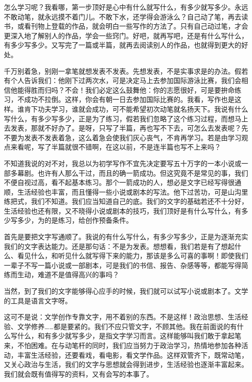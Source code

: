 \documentclass[fontset=fandol,12pt,a5paper]{ctexbook}
\begin{document}
怎么学习呢？我看哪，第一步顶好是心中有什么就写什么，有多少就写多少。永远不敢动笔，就永远摸不着门儿。不敢下水，还学得会游泳么？自己动了笔，再去读书，或看刊物上登载的作品，就会明白一些写作的方法了。只有自己动过笔，才会更深入地了解别人的作品，学会一些窍门。好吧，就再写吧，还是有什么写什么，有多少写多少。又写完了一篇或半篇，就再去阅读别人的作品，也就得到更大的好处。

千万别着急，别刚一拿笔就想发表不发表。先想发表，不是实事求是的办法。假若有个人告诉我们：他刚下过两次水，可是决定马上去参加国际游泳比赛，我们会相信他能得胜而归吗？不会！我们必定这么鼓舞他：你的志愿很好，可是要拚命练习，不成功不拉倒。这样，你会有朝一日去参加国际比赛的。我看，写作也是这样。谁肯下功夫学习，谁就会成功，可不能希望初次动笔就名扬天下。我说有什么写什么，有多少写多少，正是为了练习，假若我们忽略了这个练习过程，而想马上去发表，那就不好办了。是呀，只写了半篇，再也写不下去，可怎么去发表呢？先不要为发表不发表着急，这么着急会使我们灰心丧气，不肯再学习。若是由学习观点来看呢，写了半篇就很不错啊，在这以前，不是连半篇也写不上来吗？

不知道我说的对不对，我总以为初学写作不宜先决定要写五十万字的一本小说或一部多幕剧。也许有人那么干过，而且的确一箭成功。但这究竟不是常见的事，我们不便自视过高，看不起基本练习。那个一箭成功的人，想必是文字已经写得很通顺，生活经验也丰富，而且懂得一些小说或剧本的写法。他下过苦功，可是山沟里练把式，我们不知道。我们应当知道自己的底。我们的文字的基础若还不十分好，生活经验也还有限，又不晓得小说或剧本的技巧，我们顶好是有什么写什么，有多少写多少，为的是练习，给创作预备条件。

首先是要把文字写通顺了。我说的有什么写什么，有多少写多少，正是为逐渐充实我们的文字表达能力。还是那句话：不是为发表。想想看，我们若是有了想起什么、看见什么，和听见什么就写得下来的能力，那该是多么可喜的事啊！即使我们一辈子不写一篇小说或一部剧本，可是我们的书信、报告、杂感等等，都能写得简练而生动，难道不是值得高兴的事吗？

当然，到了我们的文字能够得心应手的时候，我们就可以试写小说或剧本了。文学的工具是语言文字呀。

这可不是说：文学创作专靠文字，用不着别的东西。不是这样！政治思想、生活经验、文学修养……都是要紧的。我们不应只管文字，不顾其他。我在前面说的有什么写什么，和有多少就写多少，是指文字学习而言。这样能够叫我们敢于拿起笔来，不怕困难。在与动笔杆的同时，我们应当努力于政治学习，热情地参加各种活动，丰富生活经验，还要看戏，看电影，看文学作品。这样双管齐下，既常动笔，又关心政治与生活，我们的文字与思想就会得到进步，生活经验也逐渐丰富起来。我们就会既有值得写的资料，又有会写的本事了。
\end{document}
